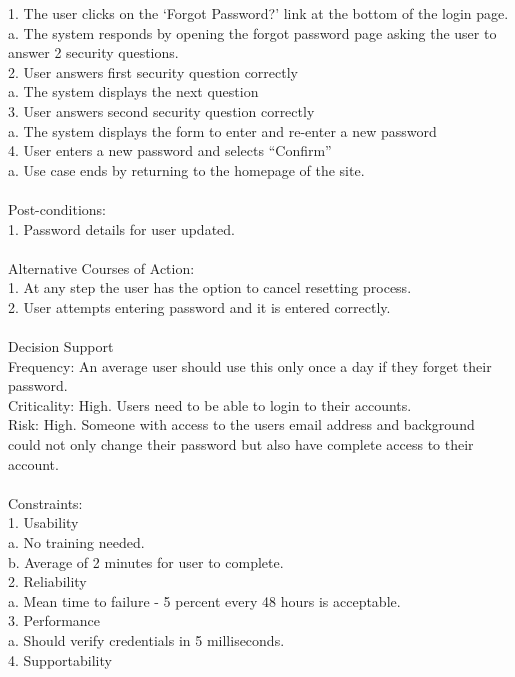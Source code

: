 \documentclass{report}
\begin{document}
1.	The user clicks on the ‘Forgot Password?’ link at the bottom of the login page. \\
	a.	The system responds by opening the forgot password page asking the user to answer 2 security questions.\\
2.	User answers first security question correctly\\
	a.	The system displays the next question\\
3.	User answers second security question correctly\\
	a.	The system displays the form to enter and re-enter a new password\\
4.	User enters a new password and selects “Confirm”\\
	a.	Use case ends by returning to the homepage of the site. \\
\\
Post-conditions: \\
1.	Password details for user updated.\\
\\
Alternative Courses of Action:\\
1.	At any step the user has the option to cancel resetting process.\\
2.	User attempts entering password and it is entered correctly.\\
\\
Decision Support\\
     Frequency: An average user should use this only once a day if they forget their password. \\
     Criticality: High. Users need to be able to login to their accounts.\\
     Risk: High. Someone with access to the users email address and background could not only change their password but also have complete access to their account.\\
\\
Constraints:\\
1.	Usability\\
	a.	No training needed.\\
	b.	Average of 2 minutes for user to complete.\\
2.	Reliability\\
	a.	Mean time to failure - 5 percent every 48 hours is acceptable.\\
3.	Performance\\
	a.	Should verify credentials in 5 milliseconds.\\
4.	Supportability\\
\end{document}
